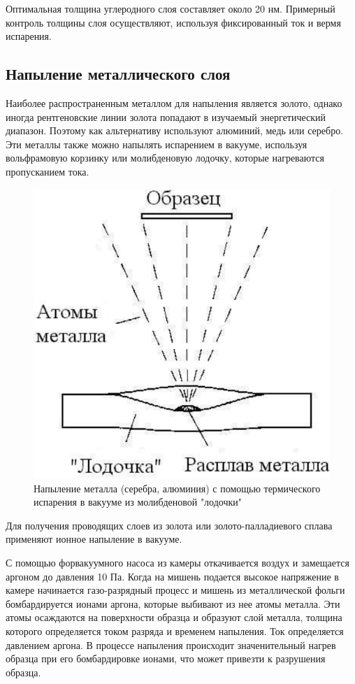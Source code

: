 \documentclass[12pt]{article}
\begin{document}
Оптимальная толщина углеродного слоя составляет около 20 нм. Примерный контроль толщины слоя осуществляют, используя фиксированный ток и вермя испарения. 

\subsection*{Напыление металлического слоя}

Наиболее распространенным металлом для напыления является золото, однако иногда рентгеновские линии золота попадают в изучаемый энергетический диапазон. Поэтому как альтернативу используют алюминий, медь или серебро. Эти металлы также можно напылять испарением в вакууме, используя вольфрамовую корзинку или молибденовую лодочку, которые нагреваются пропусканием тока. 

\begin{figure}[!ht]
\centering
\includegraphics[scale = 0.5]{pictures/boat.png}
\caption{Напыление металла (серебра, алюминия) с помощью термического испарения в вакууме из молибденовой "лодочки"}
\end{figure}

Для получения проводящих слоев из золота или золото-палладиевого сплава применяют ионное напыление в вакууме. \par
С помощью форвакуумного насоса из камеры откачивается воздух и замещается аргоном до давления 10 Па. Когда на мишень подается высокое напряжение в камере начинается газо-разрядный процесс и мишень из металлической фольги бомбардируется ионами аргона, которые выбивают из нее атомы металла. Эти атомы осаждаются на поверхности образца и образуют слой металла, толщина которого определяется током разряда и временем напыления. Ток определяется давлением аргона. В процессе напыления происходит значенительный нагрев образца при его бомбардировке ионами, что может привезти к разрушения образца. 
\end{document}
